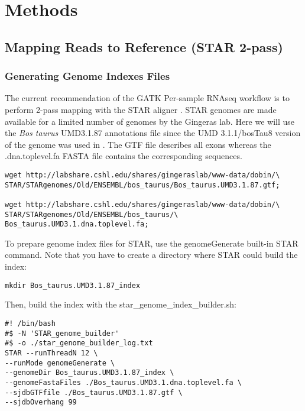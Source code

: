 

\section{Methods}



\subsection{Mapping Reads to Reference (STAR 2-pass)}



\subsubsection{Generating Genome Indexes Files}
The current recommendation of the GATK Per-sample RNAseq  workflow is to perform 2-pass mapping with the STAR aligner \cite{Dobin2013}. STAR genomes are made available for a limited number of genomes by the Gingeras lab. Here we will use the \textit{Bos taurus} UMD3.1.87 annotations file since the UMD 3.1.1/bosTau8 version of the genome was used in \citep{Ariel2021}. The GTF file describes all exons whereas the .dna.toplevel.fa FASTA file contains the corresponding sequences.

\begin{verbatim}
wget http://labshare.cshl.edu/shares/gingeraslab/www-data/dobin/\
STAR/STARgenomes/Old/ENSEMBL/bos_taurus/Bos_taurus.UMD3.1.87.gtf;

wget http://labshare.cshl.edu/shares/gingeraslab/www-data/dobin/\
STAR/STARgenomes/Old/ENSEMBL/bos_taurus/\
Bos_taurus.UMD3.1.dna.toplevel.fa;
\end{verbatim}

To prepare genome index files for STAR, use the genomeGenerate built-in STAR command.
Note that you have to create a directory where STAR could build the index:

\begin{verbatim}
mkdir Bos_taurus.UMD3.1.87_index
\end{verbatim}

Then, build the index with the star\_genome\_index\_builder.sh:
\begin{verbatim}
#! /bin/bash
#$ -N 'STAR_genome_builder'
#$ -o ./star_genome_builder_log.txt
STAR --runThreadN 12 \
--runMode genomeGenerate \
--genomeDir Bos_taurus.UMD3.1.87_index \
--genomeFastaFiles ./Bos_taurus.UMD3.1.dna.toplevel.fa \
--sjdbGTFfile ./Bos_taurus.UMD3.1.87.gtf \
--sjdbOverhang 99
\end{verbatim}




